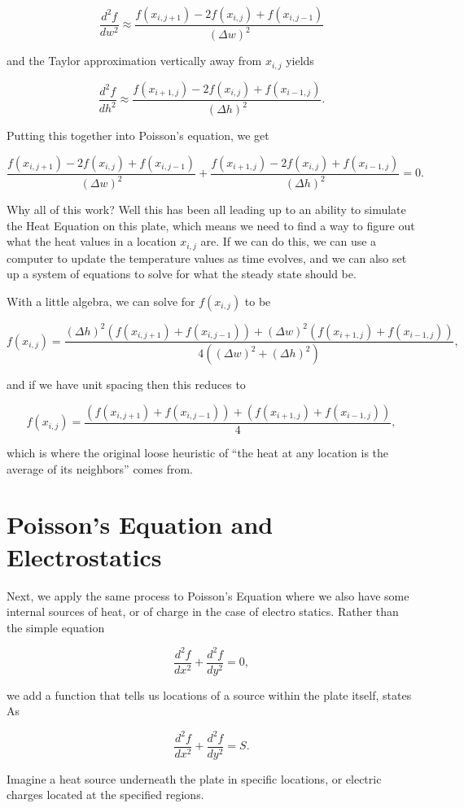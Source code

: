 \documentclass{ximera}
\begin{document}
$$\frac{d^2f}{dw^2}\approx \frac{f(x_{i,j+1})-2f(x_{i,j})+f(x_{i,j-1})}{\left(\Delta w\right)^2}$$

and the Taylor approximation vertically away from $x_{i,j}$ yields

$$\frac{d^2f}{dh^2}\approx \frac{f(x_{i+1,j})-2f(x_{i,j})+f(x_{i-1,j})}{\left(\Delta h\right)^2}.$$

Putting this together into Poisson's equation, we get

$$\frac{f(x_{i,j+1})-2f(x_{i,j})+f(x_{i,j-1})}{\left(\Delta w\right)^2}+\frac{f(x_{i+1,j})-2f(x_{i,j})+f(x_{i-1,j})}{\left(\Delta h\right)^2}=0.$$

Why all of this work? Well this has been all leading up to an ability to simulate the Heat Equation on this plate, which means we need to find a way to figure out what the heat values in a location $x_{i,j}$ are. If we can do this, we can use a computer to update the temperature values as time evolves, and we can also set up a system of equations to solve for what the steady state should be. 

With a little algebra, we can solve for $f(x_{i,j})$ to be

$$f(x_{i,j})=\frac{\left(\Delta h\right)^2(f(x_{i,j+1})+f(x_{i,j-1}))+\left(\Delta w\right)^2(f(x_{i+1,j})+f(x_{i-1,j}))}{4(\left(\Delta w\right)^2+\left(\Delta h\right)^2)},$$

and if we have unit spacing then this reduces to 

$$f(x_{i,j})=\frac{(f(x_{i,j+1})+f(x_{i,j-1}))+(f(x_{i+1,j})+f(x_{i-1,j}))}{4},$$

which is where the original loose heuristic of ``the heat at any location is the average of its neighbors'' comes from.

\section{Poisson's Equation and Electrostatics}

Next, we apply the same process to Poisson's Equation where we also have some internal sources of heat, or of charge in the case of electro statics. Rather than the simple equation 

$$\frac{d^2f}{dx^2}+\frac{d^2f}{dy^2}=0,$$

we add a function that tells us locations of a source within the plate itself, states As

$$\frac{d^2f}{dx^2}+\frac{d^2f}{dy^2}=S.$$

Imagine a heat source underneath the plate in specific locations, or electric charges located at the specified regions. 
\end{document}
